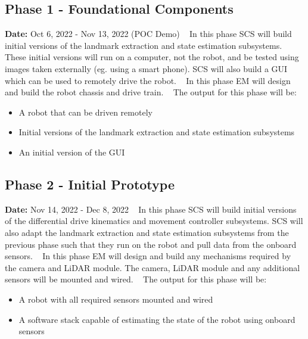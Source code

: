 \documentclass[12pt]{article}
\begin{document}
\subsection{Phase 1 - Foundational Components}
\textbf{Date:} Oct 6, 2022 - Nov 13, 2022 (POC Demo)
\ \newline\newline
In this phase SCS will build initial versions of the landmark extraction and state
estimation subsystems. These initial versions will run on a computer, not the robot,
and be tested using images taken externally (eg. using a smart phone). SCS will also build
a GUI which can be used to remotely drive the robot.
\ \newline\newline
In this phase EM will design and build the robot chassis and drive train. 
\ \newline\newline
The output for this phase will be:
\begin{itemize}
\item A robot that can be driven remotely
\item Initial versions of the landmark extraction and state estimation subsystems
\item An initial version of the GUI
\end{itemize}

\subsection{Phase 2 - Initial Prototype}
\textbf{Date:} Nov 14, 2022 - Dec 8, 2022
\ \newline\newline
In this phase SCS will build initial versions of the differential drive kinematics and
movement controller subsystems. SCS will also adapt the landmark extraction and state estimation
subsystems from the previous phase such that they run on the robot and pull data from
the onboard sensors.
\ \newline\newline
In this phase EM will design and build any mechanisms required by the camera and LiDAR module.
The camera, LiDAR module and any additional sensors will be mounted and wired. 
\ \newline\newline
The output for this phase will be:
\begin{itemize}
\item A robot with all required sensors mounted and wired
\item A software stack capable of estimating the state of the robot using onboard sensors
\end{itemize}
\end{document}
